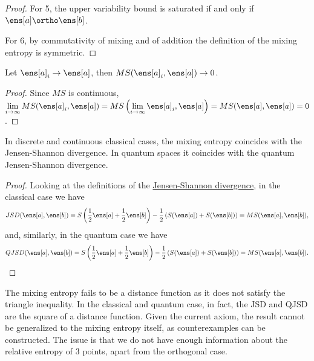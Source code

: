 \begin{mathSection}
\begin{proof}
	For 5, the upper variability bound is saturated if and only if $\ens[a] \ortho \ens[b]$.
	
	For 6, by commutativity of mixing and of addition the definition of the mixing entropy is symmetric.
\end{proof}

\begin{coro}\label{pm-es-mixingEntropyConverge}
	Let $\ens[a]_i \to \ens[a]$, then $MS(\ens[a]_i, \ens[a]) \to 0$.
\end{coro}

\begin{proof}
	Since $MS$ is continuous, $\lim\limits_{i \to \infty} MS(\ens[a]_i, \ens[a]) = MS\left(\lim\limits_{i \to \infty} \ens[a]_i, \ens[a]\right) = MS(\ens[a], \ens[a]) = 0$.
\end{proof}

\begin{prop}
	In discrete and continuous classical cases, the mixing entropy coincides with the Jensen-Shannon divergence. In quantum spaces it coincides with the quantum Jensen-Shannon divergence.
\end{prop}

\begin{proof}
	Looking at the definitions of the \href{https://en.wikipedia.org/wiki/Jensen%E2%80%93Shannon_divergence}{Jensen-Shannon divergence}, in the classical case we have
	$$ JSD(\ens[a], \ens[b]) = S\left(\frac{1}{2}\ens[a] + \frac{1}{2}\ens[b] \right)  - \frac{1}{2} \left(S(\ens[a]) + S(\ens[b])\right) = MS(\ens[a], \ens[b]),$$
	and, similarly, in the quantum case we have
	$$ QJSD(\ens[a], \ens[b]) = S\left(\frac{1}{2}\ens[a] + \frac{1}{2}\ens[b] \right)  - \frac{1}{2} \left(S(\ens[a]) + S(\ens[b])\right) = MS(\ens[a], \ens[b]).$$
\end{proof}

\begin{remark}
	The mixing entropy fails to be a distance function as it does not satisfy the triangle inequality. In the classical and quantum case, in fact, the JSD and QJSD are the square of a distance function. Given the current axiom, the result cannot be generalized to the mixing entropy itself, as counterexamples can be constructed. The issue is that we do not have enough information about the relative entropy of 3 points, apart from the orthogonal case.
	

\end{remark}
\end{mathSection}
